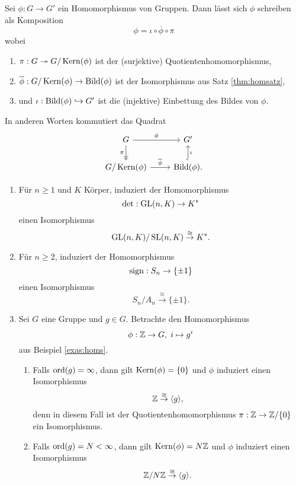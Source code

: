 \documentclass{book}
\begin{document}
\begin{cor}
    \label{cor:homsatz} Sei $\phi: G \to G'$ ein Homomorphismus von Gruppen. Dann lässt sich $\phi$ schreiben als Komposition
    \[
        \phi = \iota \circ \overline{\phi} \circ \pi
    \]
    wobei 
    \begin{enumerate}[label=\arabic*.]
        \item $\pi: G \twoheadrightarrow G/ \Kern(\phi)$ ist der (surjektive) Quotientenhomomorphismus,
        \item $\overline{\phi}: G/ \Kern(\phi) \to \Bild(\phi)$ ist der Isomorphismus aus Satz \ref{thm:homsatz}, 
        \item und $\iota: \Bild(\phi) \hra G'$ ist die (injektive) Einbettung des Bildes von $\phi$.
    \end{enumerate}
    In anderen Worten kommutiert das Quadrat
    \[
    \begin{tikzcd}
        G \ar{r}{\phi}\ar[->>,swap]{d}{\pi} & G'\\
        G/\Kern(\phi) \ar{r}{\overline{\phi}} & \Bild(\phi) \ar[hook,swap]{u}{\iota}.
    \end{tikzcd}
    \]
\end{cor}

\begin{exas}
    \label{exas:homsatz}
    \begin{enumerate}
        \item Für $n \ge 1$ und $K$ Körper, induziert der Homomorphismus 
            \[
                \det: \operatorname{GL}(n,K) \to K^*
            \]
            einen Isomorphismus
            \[
                \operatorname{GL}(n,K)/\operatorname{SL}(n,K) \overset{\cong}{\to} K^*.
            \]
        \item Für $n \ge 2$, induziert der Homomorphismus
            \[
                \operatorname{sign}: S_n \to \{\pm 1\}
            \]
            einen Isomorphismus
            \[
                S_n/A_n \overset{\cong}{\to} \{ \pm 1\}.
            \]
        \item Sei $G$ eine Gruppe und $g \in G$. Betrachte den Homomorphismus
            \[
                \phi: \ZZ \to G,\; i \mapsto g^i
            \]
            aus Beispiel \ref{exas:homs}.
            \begin{enumerate}
                \item Falls $\operatorname{ord}(g) = \infty$, dann gilt $\Kern(\phi) = \{0\}$ und $\phi$ induziert einen Isomorphismus
                    \[
                        \mathbb{Z} \overset{\cong}{\to} \langle g \rangle ,
                    \]
                    denn in diesem Fall ist der Quotientenhomomorphismus $\pi: \mathbb{Z} \to \mathbb{Z}/ \{0\}$ ein Isomorphismus.
                \item Falls $\operatorname{ord}(g) = N < \infty$, dann gilt $\Kern(\phi) = N \ZZ$ und $\phi$ induziert einen Isomorphismus
                    \[
                        \mathbb{Z}/N\mathbb{Z} \overset{\cong}{\to} \langle g \rangle .
                    \]
            \end{enumerate}
    \end{enumerate}
\end{exas}
\end{document}
